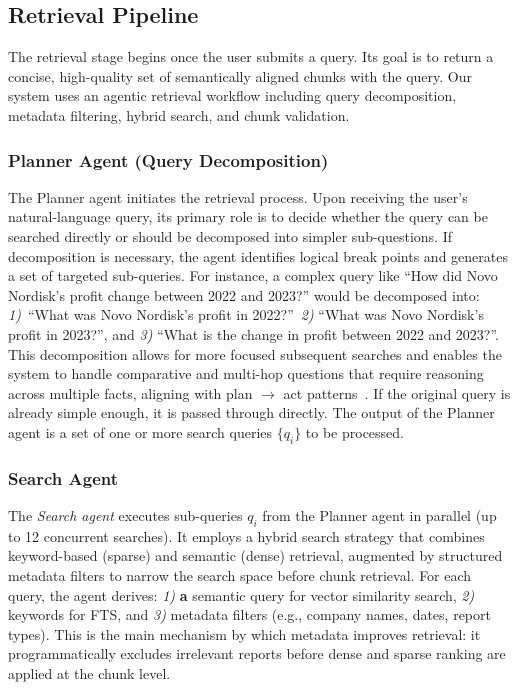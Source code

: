 \documentclass[final,5p,times,twopage,twocolumn,a4paper]{elsarticle}
\begin{document}
\subsection{Retrieval Pipeline}
The retrieval stage begins once the user submits a query. Its goal is to return a concise, high-quality set of semantically aligned chunks with the query. Our system uses an agentic retrieval workflow including query decomposition, metadata filtering, hybrid search, and chunk validation.

\subsubsection{Planner Agent (Query Decomposition)}
\label{sec:planner_agent}

The Planner agent initiates the retrieval process. Upon receiving the user's  natural-language query, its primary role is to decide whether the query can be searched directly or should be decomposed into simpler sub-questions. If decomposition is necessary, the agent identifies logical break points and generates a set of targeted sub-queries. For instance, a complex query like ``How did Novo Nordisk's profit change between 2022 and 2023?'' would be decomposed into: \textit{1)}~``What was Novo Nordisk's profit in 2022?''~\textit{2)} ``What was Novo Nordisk's profit in 2023?'', and \textit{3)} ``What is the change in profit between 2022 and 2023?''. This decomposition allows for more focused subsequent searches and enables the system to handle comparative and multi-hop questions that require reasoning across multiple facts, aligning with plan $\rightarrow$ act patterns~\cite{erdogan2025plan,wang-etal-2023-plan,yao2023react}. If the original query is already simple enough, it is passed through directly. The output of the Planner agent is a set of one or more search queries $\{q_i\}$ to be processed.



\subsubsection{Search Agent}
\label{sec:search_agent}
The \textit{Search agent} executes sub-queries $q_i$ from the Planner agent in parallel (up to 12 concurrent searches). It employs a hybrid search strategy that combines keyword-based (sparse) and semantic (dense) retrieval, augmented by structured metadata filters to narrow the search space before chunk retrieval. For each query, the agent derives: \textit{1)} \textbf{a} semantic query for vector similarity search, \textit{2)} keywords for FTS, and \textit{3)} metadata filters (e.g., company names, dates, report types). This is the main mechanism by which metadata improves retrieval: it programmatically excludes irrelevant reports before dense and sparse ranking are applied at the chunk level.
\end{document}
